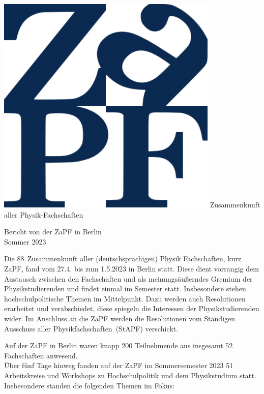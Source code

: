 \documentclass{scrartcl}
\begin{document}
\hspace{0.74\textwidth}
\begin{minipage}{0.25\textwidth}
      \vspace{-1cm}
      \centering
      \includegraphics[width=.89\textwidth]{logo.png}
      \small Zusammenkunft aller Physik-Fachschaften
\end{minipage}

\begin{center}
      \vspace{1.5cm}
      \huge{Bericht von der ZaPF in Berlin \\ Sommer 2023}
      \vspace{1cm}
\end{center}

Die 88.\,Zusammenkunft aller (deutschsprachigen) Physik Fachschaften, kurz ZaPF, fand vom 27.4. bis zum 1.5.2023 in Berlin statt. Diese dient vorrangig dem Austausch zwischen den Fachschaften und als meinungsäußerndes Gremium der Physikstudierenden und findet einmal im Semester statt.
Insbesondere stehen hochschulpolitische Themen im Mittelpunkt. 
Dazu werden auch Resolutionen erarbeitet und verabschiedet, diese spiegeln die Interessen der Physikstudierenden wider.
Im Anschluss an die ZaPF werden die Resolutionen vom Ständigen Ausschuss aller Physikfachschaften~(StAPF) verschickt.
 
Auf der ZaPF in Berlin waren knapp 200 Teilnehmende aus insgesamt 52 Fachschaften anwesend.\\
Über fünf Tage hinweg fanden auf der ZaPF im Sommersemester 2023 51 Arbeitskreise und Workshops zu Hochschulpolitik und dem Physikstudium statt. Insbesondere standen die folgenden Themen im Fokus:
\end{document}
